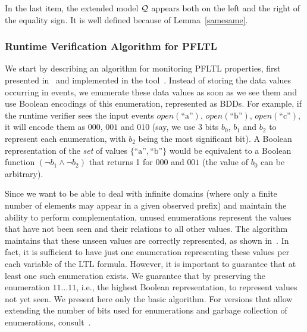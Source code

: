 In the last item, the extended model ${\cal Q}$ appears both on the left and the right of the equality sign. It is well defined because of Lemma~\ref{samesame}.

\subsubsection{Runtime Verification Algorithm for PFLTL}

We start by describing an algorithm for monitoring 
PFLTL properties, first presented in~\cite{HPU} and implemented
in the tool~\dejavu. 
Instead of storing the data values occurring in events, 
we enumerate these data values as soon as we see them and use Boolean
encodings of this enumeration, represented as BDDs.
For example, if the runtime verifier sees the input 
events 
$\mathit{open}(\text{``a''})$, 
$\mathit{open}(\text{``b''})$, 
$\mathit{open}(\text{``c''})$, 
it will encode them as
$000$, $001$ and $010$ (say, we use 3 bits $b_0$, $b_1$ and $b_2$
to represent each enumeration, with $b_2$ being the most significant bit).
%
A Boolean representation of the {\em set} of values 
$\{\text{``a''},\text{``b''}\} $ would be equivalent to a Boolean function $(\neg b_1 \wedge \neg b_2)$ that returns 1 for $000$ and $001$ (the value
of $b_0$ can be arbitrary).

%

Since we want to be able to deal with infinite domains
(where only a finite number of elements may appear in a given observed prefix) and maintain the ability to perform
complementation, unused enumerations represent the
values that have not been seen and their relations
to all other values. The algorithm maintains that these unseen values are correctly represented, as shown in~\cite{HPU}. In fact, it is sufficient to have just one enumeration representing these values per each variable of the LTL formula. However, it is important to guarantee that at least one such enumeration
exists. We guarantee that by preserving the enumeration $11\ldots11$, i.e., the highest Boolean representation,
to represent values not yet seen.
We present here only the basic algorithm. For versions that
allow extending the number of bits used for enumerations and garbage collection of enumerations, consult~\cite{HP}.


